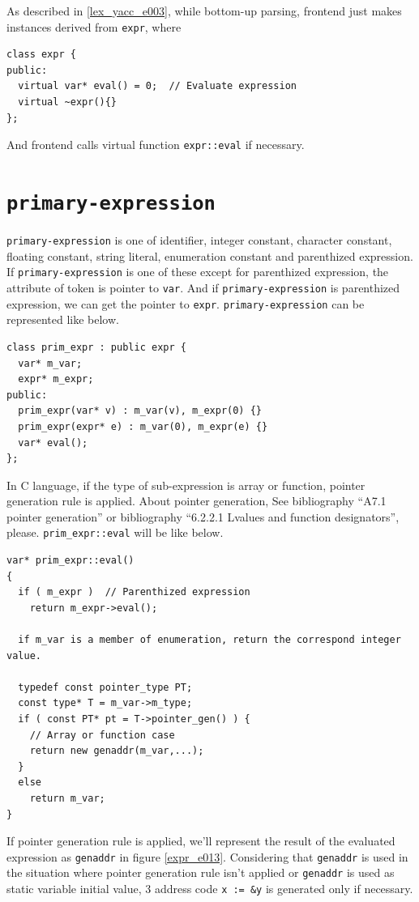 As described in \ref{lex_yacc_e003}, 
while bottom-up parsing, frontend just makes instances
derived from {\tt{expr}}, where
\begin{verbatim}
class expr {
public:
  virtual var* eval() = 0;  // Evaluate expression
  virtual ~expr(){}
};
\end{verbatim}
And frontend calls virtual function {\tt{expr::eval}} if necessary.

\section{\tt{primary-expression}}
\label{expr_e015}
{\tt{primary-expression}} is one of identifier, integer constant,
character constant, floating constant, string literal, enumeration
constant and parenthized expression. If {\tt{primary-expression}} is 
one of these except for parenthized expression, the attribute of token
is pointer to {\tt{var}}. And if {\tt{primary-expression}} is 
parenthized expression, we can get the pointer to {\tt{expr}}.
{\tt{primary-expression}} can be represented like below.
\begin{verbatim}
class prim_expr : public expr {
  var* m_var;
  expr* m_expr;
public:
  prim_expr(var* v) : m_var(v), m_expr(0) {}
  prim_expr(expr* e) : m_var(0), m_expr(e) {}
  var* eval();
};
\end{verbatim}

In C language, if the type of sub-expression is array or function,
pointer generation rule is applied. About pointer generation,
See bibliography
\cite{KR} ``A7.1 pointer generation'' or
bibliography \cite{ISO} ``6.2.2.1 Lvalues and function designators'', please.
{\tt{prim\_expr::eval}} will be like below.
\begin{verbatim}
var* prim_expr::eval()
{
  if ( m_expr )  // Parenthized expression
    return m_expr->eval();

  if m_var is a member of enumeration, return the correspond integer value.

  typedef const pointer_type PT;
  const type* T = m_var->m_type;
  if ( const PT* pt = T->pointer_gen() ) {
    // Array or function case
    return new genaddr(m_var,...);
  }
  else
    return m_var;
}
\end{verbatim}
If pointer generation rule is applied, we'll represent the result of
the evaluated expression as {\tt{genaddr}} in figure \ref{expr_e013}.
Considering that {\tt{genaddr}} is used in the situation
where pointer generation rule isn't applied or {\tt{genaddr}} is used
as static variable initial value,
3 address code {\tt{x := \&y}} is generated only if necessary.

